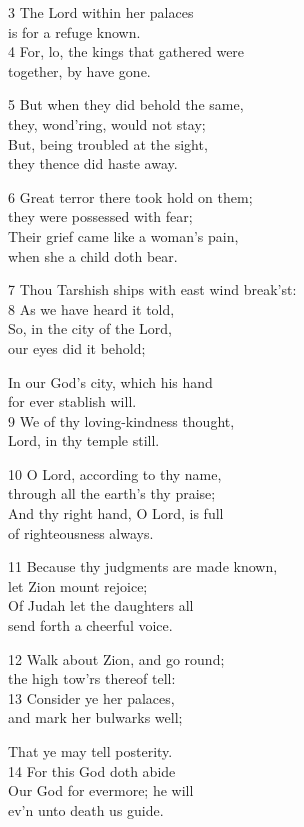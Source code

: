 3 The Lord within her palaces\\
is for a refuge known.\\
4 For, lo, the kings that gathered were\\
together, by have gone.

5 But when they did behold the same,\\
they, wond’ring, would not stay;\\
But, being troubled at the sight,\\
they thence did haste away.

6 Great terror there took hold on them;\\
they were possessed with fear;\\
Their grief came like a woman’s pain,\\
when she a child doth bear.

7 Thou Tarshish ships with east wind break’st:\\
8 As we have heard it told,\\
So, in the city of the Lord,\\
our eyes did it behold;

In our God’s city, which his hand\\
for ever stablish will.\\
9 We of thy loving-kindness thought,\\
Lord, in thy temple still.

10 O Lord, according to thy name,\\
through all the earth’s thy praise;\\
And thy right hand, O Lord, is full\\
of righteousness always.

11 Because thy judgments are made known,\\
let Zion mount rejoice;\\
Of Judah let the daughters all\\
send forth a cheerful voice.

12 Walk about Zion, and go round;\\
the high tow’rs thereof tell:\\
13 Consider ye her palaces,\\
and mark her bulwarks well;

That ye may tell posterity.\\
14 For this God doth abide\\
Our God for evermore; he will\\
ev’n unto death us guide.

